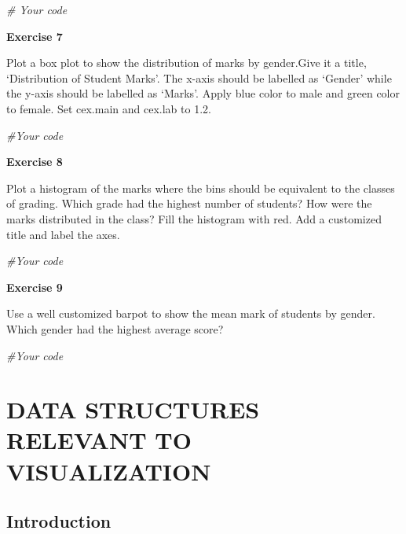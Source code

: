 \documentclass[
]{book}
\newenvironment{Shaded}{\begin{snugshade}}{\end{snugshade}}
\newcommand{\CommentTok}[1]{\textcolor[rgb]{0.56,0.35,0.01}{\textit{#1}}}
\begin{document}
\begin{Shaded}
\begin{Highlighting}[]
\CommentTok{\# Your code}
\end{Highlighting}
\end{Shaded}

\textbf{Exercise 7}

Plot a box plot to show the distribution of marks by gender.Give it a title, `Distribution of Student Marks'. The x-axis should be labelled as `Gender' while the y-axis should be labelled as `Marks'. Apply blue color to male and green color to female. Set cex.main and cex.lab to 1.2.

\begin{Shaded}
\begin{Highlighting}[]
\CommentTok{\#Your code}
\end{Highlighting}
\end{Shaded}

\textbf{Exercise 8}

Plot a histogram of the marks where the bins should be equivalent to the classes of grading. Which grade had the highest number of students? How were the marks distributed in the class? Fill the histogram with red. Add a customized title and label the axes.

\begin{Shaded}
\begin{Highlighting}[]
\CommentTok{\#Your code}
\end{Highlighting}
\end{Shaded}

\textbf{Exercise 9}

Use a well customized barpot to show the mean mark of students by gender. Which gender had the highest average score?

\begin{Shaded}
\begin{Highlighting}[]
\CommentTok{\#Your code}
\end{Highlighting}
\end{Shaded}

\chapter{DATA STRUCTURES RELEVANT TO VISUALIZATION}\label{data-structures-relevant-to-visualization}

\section{Introduction}\label{introduction-1}
\end{document}
